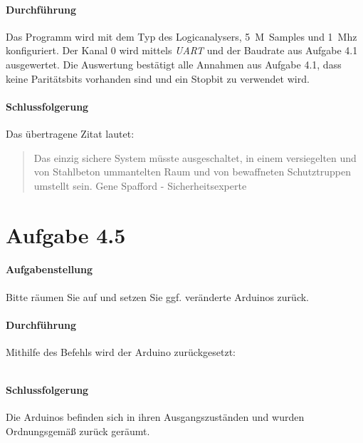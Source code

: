 \paragraph{Durchführung}
Das Programm wird mit dem Typ des Logicanalysers, \SI{5}{M Samples} und \SI{1}{Mhz} konfiguriert. Der Kanal 0 wird mittels \textit{UART} und der Baudrate aus Aufgabe 4.1 ausgewertet. Die Auswertung bestätigt alle Annahmen aus Aufgabe 4.1, dass keine Paritätsbits vorhanden sind und ein Stopbit zu verwendet wird.

\paragraph{Schlussfolgerung}
Das übertragene Zitat lautet:
\begin{quote}
	Das einzig sichere System müsste ausgeschaltet, in einem versiegelten und von Stahlbeton ummantelten Raum und von bewaffneten Schutztruppen umstellt sein. Gene Spafford - Sicherheitsexperte
\end{quote}





\newpage
\section{Aufgabe 4.5}
\paragraph{Aufgabenstellung}
Bitte räumen Sie auf und setzen Sie ggf. veränderte Arduinos zurück.

\paragraph{Durchführung}
Mithilfe des Befehls wird der Arduino zurückgesetzt:

\inputminted[breaklines, fontsize=\fontsize{10pt}{10pt}]{bash}{../docs/reset-dmx.txt}

\paragraph{Schlussfolgerung}
Die Arduinos befinden sich in ihren Ausgangszuständen und wurden Ordnungsgemäß zurück geräumt.